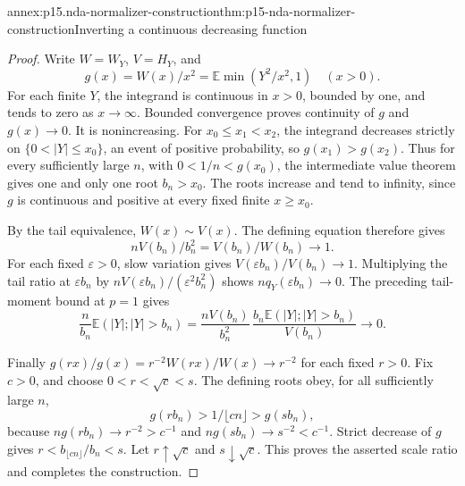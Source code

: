 \begin{annexitem}{annex:p15.nda-normalizer-construction}{thm:p15-nda-normalizer-construction}{Inverting a continuous decreasing function}
\begin{proof}
Write \(W=W_Y\), \(V=H_Y\), and
\[
 g(x)=W(x)/x^2
     =\mathbb E\min(Y^2/x^2,1)\quad(x>0).
 \]
For each finite \(Y\), the integrand is continuous in \(x>0\),
bounded by one, and tends to zero as \(x\to\infty\).
Bounded convergence proves continuity of \(g\) and \(g(x)\to0\).
It is nonincreasing. For \(x_0\leq x_1<x_2\), the
integrand decreases strictly on
\(\{0<|Y|\leq x_0\}\), an event of positive probability,
so \(g(x_1)>g(x_2)\).
Thus for every sufficiently large \(n\), with
\(0<1/n<g(x_0)\), the intermediate value theorem gives one
and only one root \(b_n>x_0\). The roots increase and tend
to infinity, since \(g\) is continuous and positive at every
fixed finite \(x\geq x_0\).

By the tail equivalence, \(W(x)\sim V(x)\).
The defining equation therefore gives
\[
 nV(b_n)/b_n^2=V(b_n)/W(b_n)\to1.
 \]
For each fixed \(\varepsilon>0\), slow variation gives
\(V(\varepsilon b_n)/V(b_n)\to1\).
Multiplying the tail ratio at \(\varepsilon b_n\) by
\(nV(\varepsilon b_n)/(\varepsilon^2b_n^2)\)
shows \(nq_Y(\varepsilon b_n)\to0\).
The preceding tail-moment bound at \(p=1\) gives
\[
 \frac{n}{b_n}\mathbb E(|Y|;|Y|>b_n)
 =\frac{nV(b_n)}{b_n^2}\,
      \frac{b_n\mathbb E(|Y|;|Y|>b_n)}{V(b_n)}\to0.
 \]

Finally \(g(rx)/g(x)=r^{-2}W(rx)/W(x)\to r^{-2}\)
for each fixed \(r>0\). Fix \(c>0\), and choose
\(0<r<\sqrt c<s\).
The defining roots obey, for all sufficiently large \(n\),
\[
 g(rb_n)>1/\lfloor cn\rfloor>g(sb_n),
 \]
because \(ng(rb_n)\to r^{-2}>c^{-1}\) and
\(ng(sb_n)\to s^{-2}<c^{-1}\).
Strict decrease of \(g\) gives
\(r<b_{\lfloor cn\rfloor}/b_n<s\).
Let \(r\uparrow\sqrt c\) and \(s\downarrow\sqrt c\).
This proves the asserted scale ratio and completes the construction.
\end{proof}
\end{annexitem}

